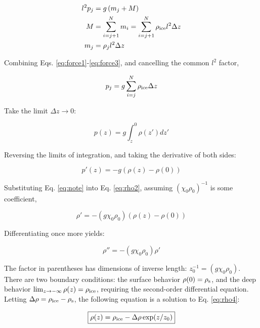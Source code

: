 \documentclass[12pt]{article}
\begin{document}
\begin{align}
l^2 p_{j} &= g\left(m_{j} + M\right) \label{eq:force1} \\
M &= \sum_{i = j+1}^{N} m_{i} = \sum_{i = j+1}^{N} \rho_{\rm ice} l^2 \Delta z \label{eq:force2} \\
m_{j} &= \rho_{j} l^2 \Delta z \label{eq:force3}
\end{align}

Combining Eqs. \ref{eq:force1}-\ref{eq:force3}, and cancelling the common $l^2$ factor,

\begin{equation}
p_{j} = g \sum_{i = j}^{N} \rho_{\rm ice} \Delta z
\end{equation}

Take the limit $\Delta z \to 0$:

\begin{equation}
p(z) = g \int_{z}^{0} \rho(z') dz'
\label{eq:rho1}
\end{equation}

Reversing the limits of integration, and taking the derivative of both sides:

\begin{equation}
p'(z) = -g(\rho(z) - \rho(0))
\label{eq:rho2}
\end{equation}

Substituting Eq. \ref{eq:note} into Eq. \ref{eq:rho2}, assuming $(\chi_0\rho_0)^{-1}$ is some coefficient,

\begin{equation}
\rho' = -\left(g \chi_0 \rho_0\right)(\rho(z)-\rho(0))
\label{eq:rho3}
\end{equation}

Differentiating once more yields:

\begin{equation}
\rho'' = -\left(g \chi_0 \rho_{0}\right) \rho'
\label{eq:rho4}
\end{equation}

The factor in parentheses has dimensions of inverse length: $z_0^{-1} = \left(g \chi_0 \rho_{0}\right)$.  There are two boundary conditions: the surface behavior $\rho(0) = \rho_{\rm s}$, and the deep behavior $\lim_{z\to-\infty} \rho(z) = \rho_{\rm ice}$, requiring the second-order differential equation.  Letting $\Delta\rho = \rho_{\rm ice} - \rho_{\rm s}$, the following equation is a solution to Eq. \ref{eq:rho4}:

\begin{equation}
\boxed{\rho(z) = \rho_{\rm ice} - \Delta \rho \exp(z/z_0)}
\label{eq:rho5}
\end{equation}
\end{document}
